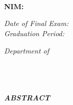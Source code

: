 %
%
%
%

\chapter*{\MakeUppercase{\textit{\judulInggris}}}

\fontsize{14}{16.8}
\begin{center}
	\vspace{0.3cm}
	\MakeUppercase{\textbf{\penulis}}\\
	\MakeUppercase{\textbf{NIM: \nim}}\\
	\fontsize{12}{14.4}
	\vspace{0.7cm}

	\textit{Date of Final Exam: \tanggalSidangInggris}\\
	\textit{Graduation Period:}\ \ \ \ \ \ \ \ \ \ \ \ \ \ \ \ \ \ \ \ \ \ \ \ \ \ \ \ \ \ \ \ \ \ \ \ \ \

	\vspace{0.7cm}
	\emph{Department of \programStudiInggris}\\
	\textit{\fakultasInggris}\\
	\universitasInggris\\
	\alamatUniversitasInggris\\

	\vspace{0.7cm}
\end{center}

\fontsize{12}{14.4}
\begin{center}\MakeUppercase{\textbf{\emph{Abstract}}}\end{center}

